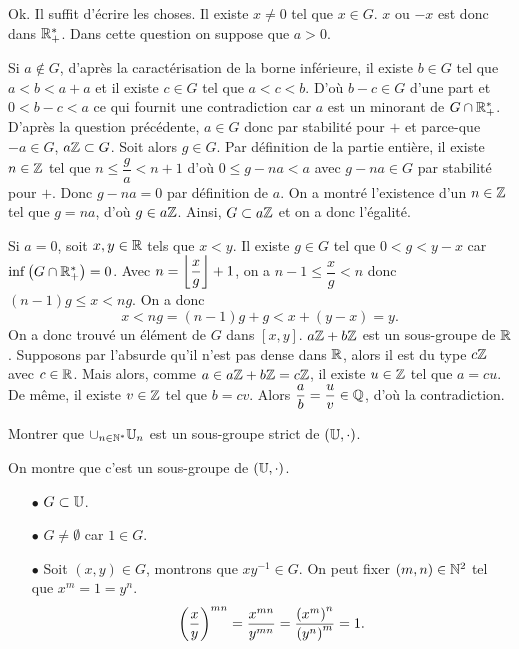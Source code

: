 \documentclass{magnolia}
\begin{document}
\begin{sol}
\begin{questions}
\question Ok. Il suffit d'écrire les choses.
\question Il existe $x\neq 0$ tel que $x\in G$. $x$ ou $-x$ est donc dans $\mathbb{R}_+^*$.
\question Dans cette question on suppose que $a>0$.
  \begin{questions}
  \question Si $a\notin G$, d'après la caractérisation de la borne inférieure, il existe $b\in G$ tel que $a<b< a+a$ et il existe $c \in G$ tel que $a<c<b$. D'où $b-c \in G$ d'une part et $0<b-c<a$ ce qui fournit une contradiction car $a$ est un minorant de $G\cap\mathbb{R}_+^*$.
  \question D'après la question précédente, $a\in G$ donc par stabilité pour $+$ et parce-que $-a\in G$, $a\mathbb{Z} \subset G$. Soit alors $g\in G$. Par définition de la partie entière, il existe $n\in \mathbb{Z}$ tel que $n\leq \dfrac{g}{a}<n+1$ d'où $0\leq g-na <a$ avec $g-na \in G$ par stabilité pour $+$. Donc $g-na=0$ par définition de $a$. On a montré l'existence d'un $n\in \mathbb{Z}$ tel que $g=na$, d'où $g \in a\mathbb{Z}$. Ainsi, $G\subset a\mathbb{Z}$ et on a donc l'égalité.
  \end{questions}
\question Si $a=0$, soit $x,y \in \mathbb{R}$ tels que $x<y$. Il existe $g\in G$ tel que $0<g<y-x$ car $\inf\left(G\cap\mathbb{R}_+^*\right)=0$. Avec $n=\left\lfloor\dfrac{x}{g}\right\rfloor+1$, on a $n-1\leq \dfrac{x}{g} <n$ donc $(n-1)g\leq x < ng$. On a donc $$x<ng=(n-1)g+g <x+(y-x)=y.$$ On a donc trouvé un élément de $G$ dans $[x,y]$.
\question 
  $a\mathbb{Z}+b\mathbb{Z}$ est un sous-groupe de $\mathbb{R}$. Supposons par l'absurde qu'il n'est pas dense dans $\mathbb{R}$, alors il est du type $c\mathbb{Z}$ avec $c\in \mathbb{R}$. Mais alors, comme $a \in a\mathbb{Z}+b\mathbb{Z}=c\mathbb{Z}$, il existe $u\in \mathbb{Z}$ tel que $a=cu$. De même, il existe $v\in \mathbb{Z}$ tel que $b=cv$. Alors $\dfrac{a}{b}=\dfrac{u}{v} \in \mathbb{Q}$, d'où la contradiction.
\question 
  
  \begin{questions}
  \question 
  \question 
  \end{questions}
\end{questions}
\end{sol}

Montrer que $\cup_{n\in\Ns} \U[n]$ est un sous-groupe strict de
$(\U,\cdot)$.

\begin{sol}
On montre que c'est un sous-groupe de $(\U,\cdot)$.
\begin{itemize}
\item[$\bullet$] $G\subset \U$.
\item[$\bullet$] $G\neq \emptyset$ car $1\in G$.
\item[$\bullet$] Soit $(x,y)\in G$, montrons que $xy^{-1} \in G$. On peut fixer $(m,n)\in \mathbb{N}^2$ tel que $x^m=1=y^n$.
$$\left(\frac{x}{y}\right)^{mn}=\frac{x^{mn}}{y^{mn}}=\frac{\left(x^m\right)^n}{\left(y^n\right)^m}=1.$$
\end{itemize}
\end{sol}
\end{document}
